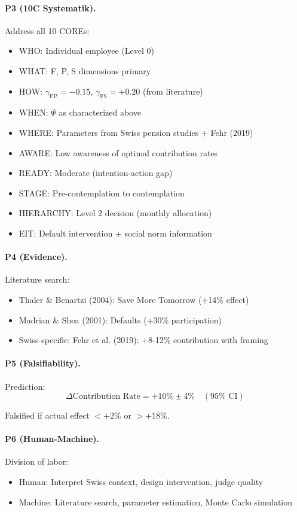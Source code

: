 \paragraph{P3 (10C Systematik).} Address all 10 COREs:
\begin{itemize}[nosep]
    \item WHO: Individual employee (Level 0)
    \item WHAT: F, P, S dimensions primary
    \item HOW: $\gamma_{\text{FP}} = -0.15$, $\gamma_{\text{FS}} = +0.20$ (from literature)
    \item WHEN: $\Psi$ as characterized above
    \item WHERE: Parameters from Swiss pension studies + Fehr (2019)
    \item AWARE: Low awareness of optimal contribution rates
    \item READY: Moderate (intention-action gap)
    \item STAGE: Pre-contemplation to contemplation
    \item HIERARCHY: Level 2 decision (monthly allocation)
    \item EIT: Default intervention + social norm information
\end{itemize}

\paragraph{P4 (Evidence).} Literature search:
\begin{itemize}[nosep]
    \item Thaler \& Benartzi (2004): Save More Tomorrow (+14\% effect)
    \item Madrian \& Shea (2001): Defaults (+30\% participation)
    \item Swiss-specific: Fehr et al. (2019): +8-12\% contribution with framing
\end{itemize}

\paragraph{P5 (Falsifiability).} Prediction:
\begin{equation}
\Delta\text{Contribution Rate} = +10\% \pm 4\% \quad (95\% \text{ CI})
\end{equation}

Falsified if actual effect $< +2\%$ or $> +18\%$.

\paragraph{P6 (Human-Machine).} Division of labor:
\begin{itemize}[nosep]
    \item Human: Interpret Swiss context, design intervention, judge quality
    \item Machine: Literature search, parameter estimation, Monte Carlo simulation
\end{itemize}

